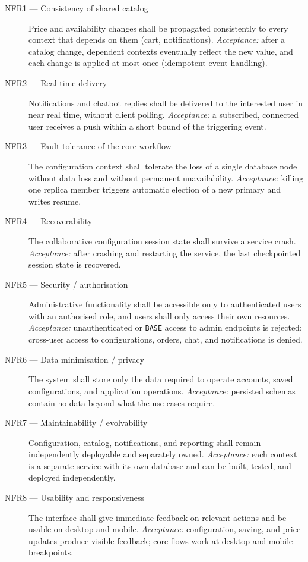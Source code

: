 \begin{description}
  \item[NFR1 --- Consistency of shared catalog] Price and availability changes
  shall be propagated consistently to every context that depends on them (cart,
  notifications). \emph{Acceptance:} after a catalog change, dependent contexts
  eventually reflect the new value, and each change is applied at most once
  (idempotent event handling).

  \item[NFR2 --- Real-time delivery] Notifications and chatbot replies shall be
  delivered to the interested user in near real time, without client polling.
  \emph{Acceptance:} a subscribed, connected user receives a push within a short
  bound of the triggering event.

  \item[NFR3 --- Fault tolerance of the core workflow] The configuration
  context shall tolerate the loss of a single database node without data loss
  and without permanent unavailability. \emph{Acceptance:} killing one replica
  member triggers automatic election of a new primary and writes resume.

  \item[NFR4 --- Recoverability] The collaborative configuration session state
  shall survive a service crash. \emph{Acceptance:} after crashing and
  restarting the service, the last checkpointed session state is recovered.

  \item[NFR5 --- Security / authorisation] Administrative functionality shall be
  accessible only to authenticated users with an authorised role, and users
  shall only access their own resources. \emph{Acceptance:} unauthenticated or
  \texttt{BASE} access to admin endpoints is rejected; cross-user access to
  configurations, orders, chat, and notifications is denied.

  \item[NFR6 --- Data minimisation / privacy] The system shall store only the
  data required to operate accounts, saved configurations, and application
  operations. \emph{Acceptance:} persisted schemas contain no data beyond what
  the use cases require.

  \item[NFR7 --- Maintainability / evolvability] Configuration, catalog,
  notifications, and reporting shall remain independently deployable and
  separately owned. \emph{Acceptance:} each context is a separate service with
  its own database and can be built, tested, and deployed independently.

  \item[NFR8 --- Usability and responsiveness] The interface shall give
  immediate feedback on relevant actions and be usable on desktop and mobile.
  \emph{Acceptance:} configuration, saving, and price updates produce visible
  feedback; core flows work at desktop and mobile breakpoints.
\end{description}

